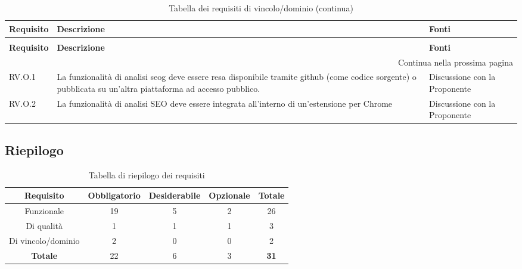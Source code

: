 \renewcommand{\arraystretch}{1.5}
\begin{longtable}{p{}p{}p{}}
\caption{Tabella dei requisti di vincolo/dominio}
\label{tab:requisiti-vincolo} \\
\hline\hline
\textbf{Requisito} & \textbf{Descrizione} & \textbf{Fonti}\\
\endfirsthead
        
\caption[]{Tabella dei requisiti di vincolo/dominio (continua)} \\
\hline\hline
\textbf{Requisito} & \textbf{Descrizione} & \textbf{Fonti} \\ 
\endhead
        
\multicolumn{3}{r}{{Continua nella prossima pagina}} \\ 
\endfoot
        
\hline
\endlastfoot

\hline
RV.O.1 & La funzionalità di analisi \gls{seog} deve essere resa disponibile tramite \gls{github} (come codice sorgente) o pubblicata su un'altra piattaforma ad accesso pubblico. & Discussione con la Proponente \\
\hline
RV.O.2 & La funzionalità di analisi SEO deve essere integrata all'interno di un'estensione per Chrome & Discussione con la Proponente \\
\end{longtable}

\par\vspace{20pt}

\subsection{Riepilogo}

\begin{table}[H]
\centering
\caption{Tabella di riepilogo dei requisiti}
\label{tab:riepilogo-requisiti}
\begin{tabular}{ccccc}
\hline\hline
\textbf{Requisito} & \textbf{Obbligatorio} & \textbf{Desiderabile} & \textbf{Opzionale} & \textbf{Totale} \\ 
\hline
Funzionale & 19 & 5 & 2 & 26 \\
\hline
Di qualità & 1 & 1 & 1 & 3 \\
\hline 
Di vincolo/dominio & 2 & 0 & 0 & 2 \\
\hline
\textbf{Totale} & 22 & 6 & 3 & \textbf{31} \\ 
\hline
\end{tabular}
\end{table}

